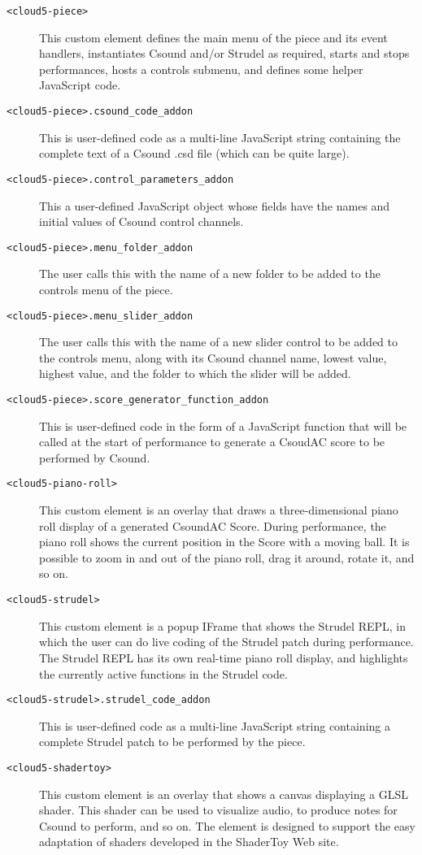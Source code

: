\documentclass[runningheads,a4paper]{llncs}
\begin{document}
\begin{description}
\item[\texttt{<cloud5-piece>}] This custom element defines the main menu of the piece and its event handlers, instantiates Csound and/or Strudel as required, starts and stops performances, hosts a controls submenu, and defines some helper JavaScript code.
\item[\texttt{<cloud5-piece>.csound\_code\_addon}]  This is user-defined code as a multi-line JavaScript string containing the complete text of a Csound .csd file (which can be quite large).
\item[\texttt{<cloud5-piece>.control\_parameters\_addon}]  This a user-defined JavaScript object whose fields have the names and initial values of Csound control channels.
\item[\texttt{<cloud5-piece>.menu\_folder\_addon}]  The user calls this with the name of a new folder to be added to the controls menu of the piece.
\item[\texttt{<cloud5-piece>.menu\_slider\_addon}]  The user calls this with the name of a new slider control to be added to the controls menu, along with its Csound channel name, lowest value, highest value, and the folder to which the slider will be added.
\item[\texttt{<cloud5-piece>.score\_generator\_function\_addon}]  This is user-defined code in the form of a JavaScript function that will be called at the start of performance to generate a CsoudAC score to be performed by Csound. 
\item[\texttt{<cloud5-piano-roll>}] This custom element is an overlay that draws a three-dimensional piano roll display of a generated CsoundAC Score. During performance, the piano roll shows the current position in the Score with a moving ball. It is possible to zoom in and out of the piano roll, drag it around, rotate it, and so on.
\item[\texttt{<cloud5-strudel>}] This custom element is a popup IFrame that shows the Strudel REPL, in which the user can do live coding of the Strudel patch during performance. The Strudel REPL has its own real-time piano roll display, and highlights the currently active functions in the Strudel code.
\item[\texttt{<cloud5-strudel>.strudel\_code\_addon}] This is user-defined code as a multi-line JavaScript string containing a complete Strudel patch to be performed by the piece.
\item[\texttt{<cloud5-shadertoy>}] This  custom element is an overlay that shows a canvas displaying a GLSL shader. This shader can be used to visualize audio, to produce notes for Csound to perform, and so on. The element is designed to support the easy adaptation of shaders developed in the ShaderToy Web site.

\end{description}
\end{document}

